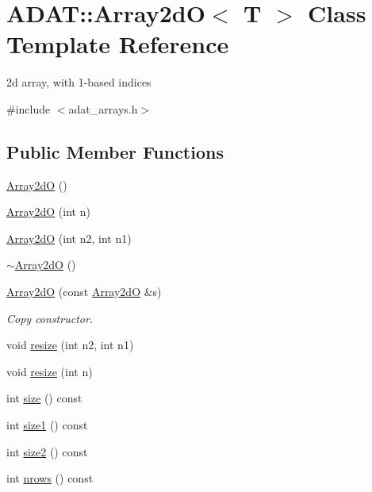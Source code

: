 \hypertarget{classADAT_1_1Array2dO}{}\section{A\+D\+AT\+:\+:Array2dO$<$ T $>$ Class Template Reference}
\label{classADAT_1_1Array2dO}


2d array, with 1-\/based indices  




{\ttfamily \#include $<$adat\+\_\+arrays.\+h$>$}

\subsection*{Public Member Functions}
\begin{DoxyCompactItemize}
\item 
\mbox{\hyperlink{classADAT_1_1Array2dO_ad54b38527daf48956f3de486768f11b0}{Array2dO}} ()
\item 
\mbox{\hyperlink{classADAT_1_1Array2dO_a4672a22c0a06c8bd84cc4bb60f4f5220}{Array2dO}} (int n)
\item 
\mbox{\hyperlink{classADAT_1_1Array2dO_aeb2cee33d054dc6f4e4db1b8d5b9b06f}{Array2dO}} (int n2, int n1)
\item 
\mbox{\hyperlink{classADAT_1_1Array2dO_a8877788a45155005f08d8b7b02db82b0}{$\sim$\+Array2dO}} ()
\item 
\mbox{\hyperlink{classADAT_1_1Array2dO_a9d759d2058e98b6ce4b2e1a373075bc0}{Array2dO}} (const \mbox{\hyperlink{classADAT_1_1Array2dO}{Array2dO}} \&s)
\begin{DoxyCompactList}\small\item\em Copy constructor. \end{DoxyCompactList}\item 
void \mbox{\hyperlink{classADAT_1_1Array2dO_abccbac468c29e2d8a24b9cd317e92247}{resize}} (int n2, int n1)
\item 
void \mbox{\hyperlink{classADAT_1_1Array2dO_aebe81d1fc5cdfea1b7a36effad3fb2e2}{resize}} (int n)
\item 
int \mbox{\hyperlink{classADAT_1_1Array2dO_a2f8311cdee5283e57e5d13887a463123}{size}} () const
\item 
int \mbox{\hyperlink{classADAT_1_1Array2dO_a8713bf273adbc5e2313e1afd8f88fe7c}{size1}} () const
\item 
int \mbox{\hyperlink{classADAT_1_1Array2dO_a0e743678b1d8c06547715d8929c9b2bf}{size2}} () const
\item 
int \mbox{\hyperlink{classADAT_1_1Array2dO_a8c2e98f898dd0406c9ac9c9e04b1eb0d}{nrows}} () const

\end{DoxyCompactItemize}
